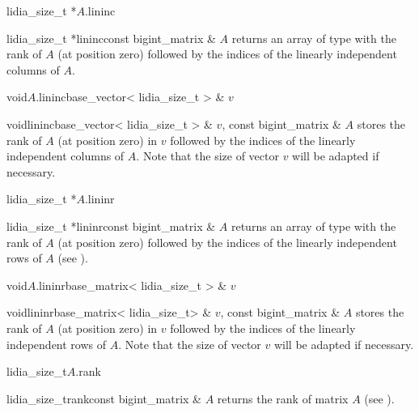 {\begin{cfcode}{lidia_size_t *}{$A$.lininc}{}
\end{cfcode}

\begin{fcode}{lidia_size_t *}{lininc}{const bigint_matrix & $A$}
  returns an array of type  with the rank of $A$ (at position zero) followed
  by the indices of the linearly independent columns of $A$.
\end{fcode}

\begin{cfcode}{void}{$A$.lininc}{base_vector< lidia_size_t > & $v$}
\end{cfcode}

\begin{fcode}{void}{lininc}{base_vector< lidia_size_t > & $v$, const bigint_matrix & $A$}
  stores the rank of $A$ (at position zero) in  $v$ followed by the indices of
  the linearly independent columns of $A$.  Note that the size of vector $v$ will be adapted if
  necessary.
\end{fcode}

\begin{cfcode}{lidia_size_t *}{$A$.lininr}{}
\end{cfcode}

\begin{fcode}{lidia_size_t *}{lininr}{const bigint_matrix & $A$}
  returns an array of type  with the rank of $A$ (at position zero) followed
  by the indices of the linearly independent rows of $A$ (see \cite{Mueller_Thesis:1994}).
\end{fcode}

\begin{cfcode}{void}{$A$.lininr}{base_matrix< lidia_size_t > & $v$}
\end{cfcode}

\begin{fcode}{void}{lininr}{base_matrix< lidia_size_t> & $v$, const bigint_matrix & $A$}
  stores the rank of $A$ (at position zero) in  $v$ followed by the indices of
  the linearly independent rows of $A$.  Note that the size of vector $v$ will be adapted if
  necessary.
\end{fcode}

\begin{cfcode}{lidia_size_t}{$A$.rank}{}
\end{cfcode}

\begin{fcode}{lidia_size_t}{rank}{const bigint_matrix & $A$}
  returns the rank of matrix $A$ (see \cite{Mueller_Thesis:1994}).
\end{fcode}

}
